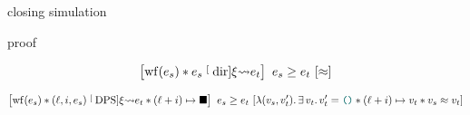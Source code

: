 

%

closing simulation

proof


\begin{theorem}
    \[
        \iCsimvHoare{
            \wf{\datalangExpr_s} \iSep
            \datalangExpr_s \tmcDir{\datalangRenaming} \datalangExpr_t
        }{
            \iSimilar
        }{
            \datalangExpr_s
        }{
            \datalangExpr_t
        }
    \]
\end{theorem}

\begin{theorem}
    \[
        \iCsimvHoare{
            \wf{\datalangExpr_s} \iSep
            (\datalangLoc, \datalangIdx, \datalangExpr_s) \tmcDps{\datalangRenaming} \datalangExpr_t \iSep
            (\datalangLoc + \datalangIdx) \iPointsto \datalangHole
        }{
            \lambdaAbs (\datalangVal_s, \datalangVal_t') \ldotp
            \exists \datalangVal_t \ldotp
            \datalangVal_t' = \datalangUnit \iSep
            (\datalangLoc + \datalangIdx) \iPointsto \datalangVal_t \iSep
            \datalangVal_s \iSimilar \datalangVal_t
        }{
            \datalangExpr_s
        }{
            \datalangExpr_t
        }
    \]
\end{theorem}


